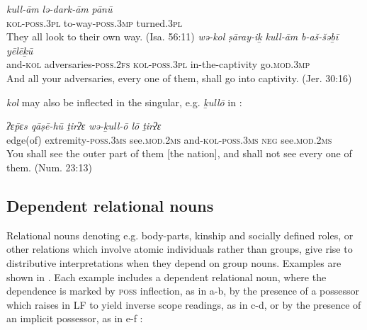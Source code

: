 \documentclass[output=paper]{langsci/langscibook}
\begin{document}
\ea%
    \label{ex:doron:49}
    \ea
    \gll \textit{kull-ām}             \textit{lə-dark-ām}            \textit{pānū}\\
         \textsc{kol-poss.3pl}  to-way-\textsc{poss.3mp}  turned.\textsc{3pl}\\
    \glt They all look to their own way. (Isa. 56:11)
    \ex  
    \gll \textit{wə-kol}     \textit{ṣāray-iḵ}                        \textit{kull-ām}            \textit{b-aš-šəḇī}            \textit{yēlēḵū}\\
         and-\textsc{kol} adversaries-\textsc{poss.2fs}   \textsc{kol-poss.3pl}  in-the-captivity  go.\textsc{mod.3mp} \\
    \glt And all your adversaries, every one of them, shall go into captivity.  (Jer. 30:16)
    \z
\z    

\textit{kol} may also be inflected in the singular, e.g. \textit{ḵullō} in :

\ea%
    \label{ex:doron:50}
    \gll \textit{ʔɛ\={p}ɛs      qāṣē-hū                      ṯirʔɛ                 wə-ḵull-ō                  lō      ṯirʔɛ}\\
         edge(of) extremity-\textsc{poss.3ms}  see.\textsc{mod.}2\textsc{ms}   and-\textsc{kol}{}-\textsc{poss.}3\textsc{ms}  \textsc{neg}  see.\textsc{mod.}2\textsc{ms}\\
    \glt You shall see the outer part of them [the nation], and shall not see every one of them. (Num. 23:13)
    \z

\subsection{Dependent relational nouns}%

Relational nouns denoting e.g. body-parts, kinship and socially defined roles, or other relations which involve atomic individuals rather than groups, give rise to distributive interpretations when they depend on group nouns. Examples are shown in . Each example includes a dependent relational noun, where the dependence is marked by \textsc{poss} inflection, as in  a-b, by the presence of a possessor which raises in LF to yield inverse scope readings, as in  c-d, or by the presence of an implicit possessor, as in  e-f :
\end{document}
